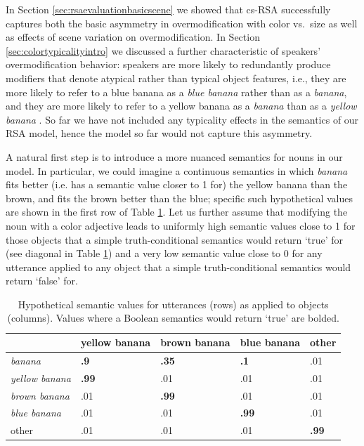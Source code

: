 \documentclass[11pt]{article}
\newcommand{\tableref}[1]{Table \ref{#1}}
\newcommand{\sectionref}[1]{Section \ref{#1}}
\begin{document}
In \sectionref{sec:rsaevaluationbasicscene} we showed that cs-RSA successfully captures both the basic asymmetry in overmodification with color vs.~size as well as effects of scene variation on overmodification. In \sectionref{sec:colortypicalityintro} we discussed a further characteristic of speakers' overmodification behavior: speakers are more likely to redundantly produce modifiers that denote atypical rather than typical object features, i.e., they are more likely to refer to a blue banana as a \emph{blue banana} rather than as a \emph{banana}, and they are more likely to refer to a yellow banana as a \emph{banana} than as a \emph{yellow banana} \cite{sedivy2003a, Westerbeek2015}. 
So far we have not included any typicality effects in the semantics of our RSA model, hence the model so far would not capture this asymmetry.

A natural first step is to introduce a more nuanced semantics for nouns in our model. 
In particular, we could imagine a continuous semantics in which \emph{banana} fits better (i.e. has a semantic value closer to 1 for) the yellow banana than the brown, and fits the brown better than the blue; specific such hypothetical values are shown in the first row of \tableref{tab:colorobjectfidelities}. Let us further assume that modifying the noun with a color adjective leads to uniformly high semantic values close to 1 for those objects that a simple truth-conditional semantics would return `true' for (see diagonal in \tableref{tab:colorobjectfidelities}) and a very low semantic value close to 0 for any utterance applied to any object that a simple truth-conditional semantics would return `false' for.

\begin{table}
\centering
\caption{Hypothetical semantic values for utterances (rows) as applied to objects (columns). Values where a Boolean semantics would return `true' are bolded.}
\begin{tabular}{l l l l l}
\toprule
 & yellow banana & brown banana & blue banana & other\\
\midrule
\emph{banana} & \bf{.9} & \bf{.35} & \bf{.1} & .01 \\
\midrule
\emph{yellow banana} & \bf{.99} & .01 & .01 & .01 \\
\emph{brown banana} & .01 & \bf{.99} & .01 & .01 \\
\emph{blue banana} & .01 & .01 & \bf{.99} & .01 \\
\midrule
other & .01 & .01 & .01 & \bf{.99} \\
\bottomrule
\end{tabular}
\label{tab:colorobjectfidelities}
\end{table}
\end{document}
